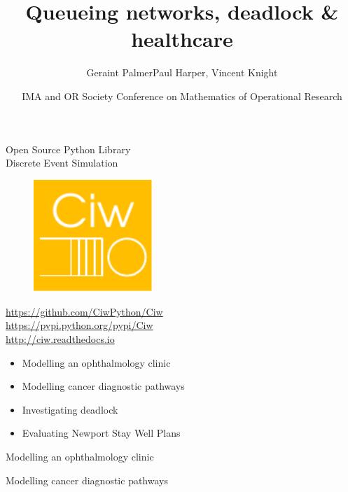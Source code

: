 \documentclass[xcolor={table}]{beamer}
\title{Queueing networks, deadlock \& healthcare}
\author{Geraint Palmer\newline \scriptsize{Paul Harper, Vincent Knight}}
\date{IMA and OR Society Conference on Mathematics of Operational Research}
\begin{document}
\frame{\titlepage}


\begin{frame}
\begin{center}
Open Source Python Library\\
Discrete Event Simulation\\
\begin{figure}
\includegraphics[width=0.4\textwidth]{../images/ciwlogo}
\end{figure}
{\footnotesize{\textcolor{orange}{
\url{https://github.com/CiwPython/Ciw}\\
\url{https://pypi.python.org/pypi/Ciw}\\
\url{http://ciw.readthedocs.io}\\}
}}
\end{center}
\end{frame}

\begin{frame}
\begin{itemize}
  \item Modelling an ophthalmology clinic
  \item Modelling cancer diagnostic pathways
  \vspace{10mm}
  \item Investigating deadlock
  \vspace{10mm}
  \item Evaluating Newport Stay Well Plans
\end{itemize}
\end{frame}

\begin{frame}{Modelling an ophthalmology clinic}
\begin{center}

\end{center}
\end{frame}

\begin{frame}{Modelling cancer diagnostic pathways}
\begin{center}

\end{center}
\end{frame}
\end{document}
